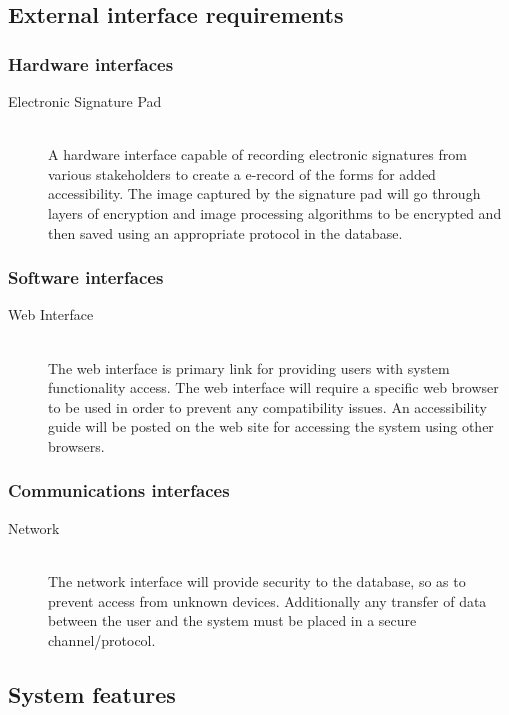 \documentclass{journal}
\begin{document}
\subsection{External interface requirements}
\subsubsection{Hardware interfaces}

\begin{description}
\item[Electronic Signature Pad]\hfill \\
		A hardware interface capable of recording electronic signatures from various stakeholders to create a e-record of the forms for added accessibility. The image captured by the signature pad will go through layers of encryption and image processing algorithms to be encrypted and then saved using an appropriate protocol in the database. 
		\end{description}

		\subsubsection{Software interfaces}
		\begin{description}
		\item[Web Interface]\hfill \\
			The web interface is primary link for providing users with system functionality access. The web interface will require a specific web browser to be used in order to prevent any compatibility issues. An accessibility guide will be posted on the web site for accessing the system using other browsers. 
			\end{description}

			\subsubsection{Communications interfaces}
			\begin{description}
			\item[Network]\hfill \\
				The network interface will provide security to the database, so as to prevent access from unknown devices. Additionally any transfer of data between the user and the system must be placed in a secure channel/protocol.  
				\end{description}


				\subsection{System features}
\end{document}
